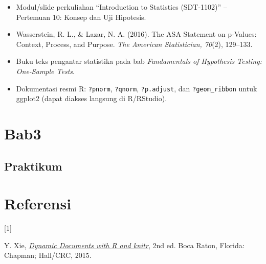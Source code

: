 \documentclass[
  indonesian,
  letterpaper,
]{book}
\newlength{\cslhangindent}
\newlength{\csllabelwidth}
\newenvironment{CSLReferences}[2] %
 {\begin{list}{}{%
  \setlength{\itemindent}{0pt}
  \setlength{\leftmargin}{0pt}
  \setlength{\parsep}{0pt}
  \ifodd #1
   \setlength{\leftmargin}{\cslhangindent}
   \setlength{\itemindent}{-1\cslhangindent}
  \fi
  \setlength{\itemsep}{#2\baselineskip}}}
 {\end{list}}
\newcommand{\CSLLeftMargin}[1]{\parbox[t]{\csllabelwidth}{\strut#1\strut}}
\newcommand{\CSLRightInline}[1]{\parbox[t]{\linewidth - \csllabelwidth}{\strut#1\strut}}
\providecommand{\tightlist}{%
  \setlength{\itemsep}{0pt}\setlength{\parskip}{0pt}}
\begin{document}
\begin{itemize}
\tightlist
\item
  Modul/slide perkuliahan ``Introduction to Statistics (SDT-1102)'' --
  Pertemuan 10: Konsep dan Uji Hipotesis.
\item
  Wasserstein, R. L., \& Lazar, N. A. (2016). The ASA Statement on
  p-Values: Context, Process, and Purpose. \emph{The American
  Statistician, 70}(2), 129--133.
\item
  Buku teks pengantar statistika pada bab \emph{Fundamentals of
  Hypothesis Testing: One-Sample Tests}.
\item
  Dokumentasi resmi R: \texttt{?pnorm}, \texttt{?qnorm},
  \texttt{?p.adjust}, dan \texttt{?geom\_ribbon} untuk ggplot2 (dapat
  diakses langsung di R/RStudio).
\end{itemize}


\chapter{Bab3}\label{bab3}

\section{Praktikum}\label{praktikum}


\chapter*{Referensi}\label{referensi}


\protect{}\label{refs}
\begin{CSLReferences}{0}{0}
\CSLLeftMargin{{[}1{]} }%
\CSLRightInline{Y. Xie, \emph{\href{http://yihui.name/knitr/}{Dynamic
Documents with {R} and knitr}}, 2nd ed. Boca Raton, Florida: Chapman;
Hall/CRC, 2015.}

\end{CSLReferences}


\backmatter
\end{document}
